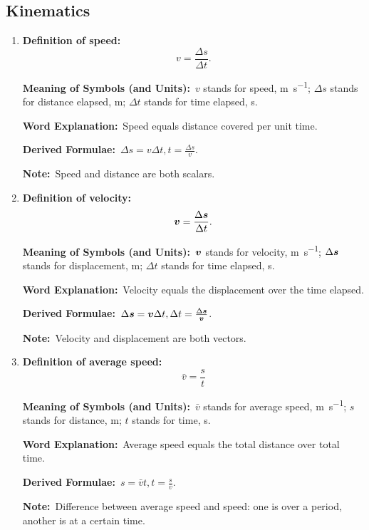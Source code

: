 \documentclass[8pt]{article}
\newcommand{\MeanSymb}{\textbf{Meaning of Symbols (and Units):}\ }
\newcommand{\WordExpl}{\textbf{Word Explanation:}\ }
\newcommand{\DeriForm}{\textbf{Derived Formulae:}\ }
\newcommand{\Note}{\textbf{Note:}\ }
\begin{document}
        \subsection{Kinematics}
            \begin{enumerate}
                \item \textbf{Definition of speed:}
                \[
                    v = \frac{\Delta s}{\Delta t}.
                \]

                \MeanSymb \(v\) stands for speed, \unit{\metre\per\second}; \(\Delta s\) stands for distance elapsed, \unit{\metre}; \(\Delta t\) stands for time elapsed, \unit{\second}.

                \WordExpl Speed equals distance covered per unit time.

                \DeriForm \(\Delta s = v \Delta t, t = \frac{\Delta s}{v}\).

                \Note Speed and distance are both scalars.

                \item \textbf{Definition of velocity:}
                \[
                    \boldsymbol{v} = \frac{\Delta \boldsymbol{s}}{\Delta t}.
                \]

                \MeanSymb \(\boldsymbol{v}\) stands for velocity, \unit{\metre\per\second}; \(\Delta \boldsymbol{s}\) stands for displacement, \unit{\metre}; \(\Delta t\) stands for time elapsed, \unit{\second}.

                \WordExpl Velocity equals the displacement over the time elapsed.

                \DeriForm \(\Delta \boldsymbol{s} = \boldsymbol{v} \Delta t, \Delta t = \frac{\Delta \boldsymbol{s}}{\boldsymbol{v}}\).

                \Note Velocity and displacement are both vectors.
            
                \item \textbf{Definition of average speed:}
                \[
                    \bar{v} = \frac{s}{t}
                \]

                \MeanSymb \(\bar{v}\) stands for average speed, \unit{\metre\per\second}; \(s\) stands for distance, \unit{\metre}; \(t\) stands for time, \unit{\second}.

                \WordExpl Average speed equals the total distance over total time.

                \DeriForm \(s = \bar{v}t, t = \frac{s}{\bar{v}}\).

                \Note Difference between average speed and speed: one is over a period, another is at a certain time.


\end{enumerate}
\end{document}
